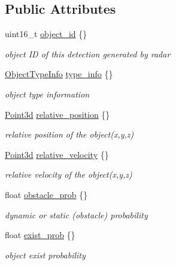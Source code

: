 \subsection*{Public Attributes}
\begin{DoxyCompactItemize}
\item 
uint16\+\_\+t \hyperlink{structmaf__perception__interface_1_1BasicRadarPerceptionObjectData_a269b473a8878b1caa8074c080f24b6d2}{object\+\_\+id} \{\}
\begin{DoxyCompactList}\small\item\em object ID of this detection generated by radar \end{DoxyCompactList}\item 
\hyperlink{structmaf__perception__interface_1_1ObjectTypeInfo}{Object\+Type\+Info} \hyperlink{structmaf__perception__interface_1_1BasicRadarPerceptionObjectData_a88b30069295d7189475bef88f6cf8f4b}{type\+\_\+info} \{\}
\begin{DoxyCompactList}\small\item\em object type information \end{DoxyCompactList}\item 
\hyperlink{structmaf__perception__interface_1_1Point3d}{Point3d} \hyperlink{structmaf__perception__interface_1_1BasicRadarPerceptionObjectData_a6934d029d9d6f143c98bed3c1ef7ee78}{relative\+\_\+position} \{\}
\begin{DoxyCompactList}\small\item\em relative position of the object(x,y,z) \end{DoxyCompactList}\item 
\hyperlink{structmaf__perception__interface_1_1Point3d}{Point3d} \hyperlink{structmaf__perception__interface_1_1BasicRadarPerceptionObjectData_aa10350f39db94889fd027d7d27cb9839}{relative\+\_\+velocity} \{\}
\begin{DoxyCompactList}\small\item\em relative velocity of the object(x,y,z) \end{DoxyCompactList}\item 
float \hyperlink{structmaf__perception__interface_1_1BasicRadarPerceptionObjectData_aaee9dce18af5711850451936bdd3718f}{obstacle\+\_\+prob} \{\}
\begin{DoxyCompactList}\small\item\em dynamic or static (obstacle) probability \end{DoxyCompactList}\item 
float \hyperlink{structmaf__perception__interface_1_1BasicRadarPerceptionObjectData_a1b96e7abfc90487a5e885eedd3deb317}{exist\+\_\+prob} \{\}
\begin{DoxyCompactList}\small\item\em object exist probability \end{DoxyCompactList}\end{DoxyCompactItemize}


